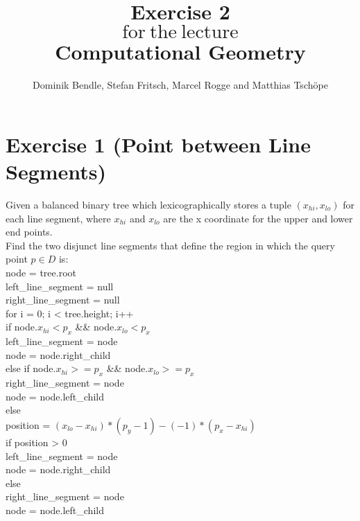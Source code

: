 \documentclass[english, fontsize=12pt, paper=a4, twoside=false, open=right, draft=true, pagesize=auto, version=last, DIV=16]{scrartcl}
\theoremstyle{break}
\begin{document}
\title{
\vspace*{-10mm}
Exercise 2 \\[-3pt]
{\Large $\mathrm{for \ the \ lecture}$} \\[-3pt]
{\LARGE \textbf{Computational Geometry}}
}
\author{Dominik Bendle, Stefan Fritsch, Marcel Rogge and Matthias Tschöpe}
\maketitle
\vspace*{-10mm}

\section*{Exercise 1 (Point between Line Segments)}
Given a balanced binary tree which lexicographically stores a tuple $(x_{hi}, x_{lo})$ for each line segment, where $x_{hi}$ and $x_{lo}$ are the x coordinate for the upper and lower end points.\\
Find the two disjunct line segments that define the region in which the query point $p \in D$ is:\\

node = tree.root\\
left\_line\_segment = null\\
right\_line\_segment = null\\

for i = 0;  i < tree.height; i++\\
\hspace*{10mm}if node.$x_{hi} < p_x$ \&\& node.$x_{lo} < p_x$\\
\hspace*{20mm}left\_line\_segment = node\\
\hspace*{20mm}node = node.right\_child\\
\hspace*{10mm}else if node.$x_{hi} >= p_x$ \&\& node.$x_{lo} >= p_x$\\
\hspace*{20mm}right\_line\_segment = node\\
\hspace*{20mm}node = node.left\_child\\
\hspace*{10mm}else\\
\hspace*{20mm}position = $(x_{lo} - x_{hi}) * (p_y - 1) - (-1) * (p_x - x_{hi})$\\
\hspace*{20mm}if position > 0\\
\hspace*{30mm}left\_line\_segment = node\\
\hspace*{30mm}node = node.right\_child\\
\hspace*{20mm}else\\
\hspace*{30mm}right\_line\_segment = node\\
\hspace*{30mm}node = node.left\_child\\
\end{document}
